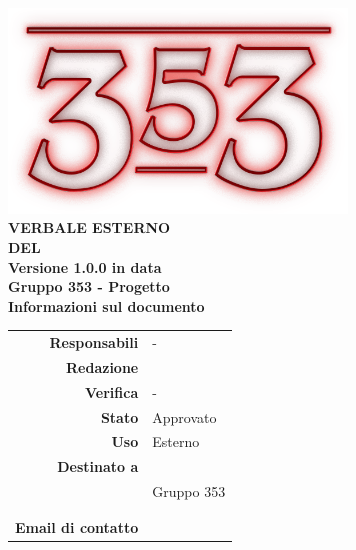 \documentclass[openany, a4paper, 12pt]{report}
\begin{document}
\begin{titlepage}
	\centering
	\vfill
	{
		\bfseries
		\vskip2cm
		\includegraphics[width=9cm]{../../common/images/logo.png} \\
		\vfill
		\Huge{VERBALE ESTERNO\\DEL {}}\\
		\vfill
		\Large Versione 1.0.0 in data \\
		\large Gruppo 353 - Progetto \progetto \\
		\vfill
		\normalsize Informazioni sul documento\\
		\begin{table}[htbp]
			\centering
			\renewcommand\arraystretch{1.2}
			\begin{tabular}{r|l}
				\hline
				\textbf{Responsabili}	& -\\
				
				\textbf{Redazione} 		& \Elena \\
				\textbf{Verifica} 		& - \\	
				
				\textbf{Stato} 			& Approvato\\
				\textbf{Uso}			& Esterno\\
				\textbf{Destinato a}   	& \Proponente\\
										& Gruppo 353\\
										& \Vardanega\\
										& \Cardin\\

				\textbf{Email di contatto}	& \mailgroup
			\end{tabular}
		\end{table}
		\vfill 
	}    
\end{titlepage}
\newpage
{}

 
\end{document}
